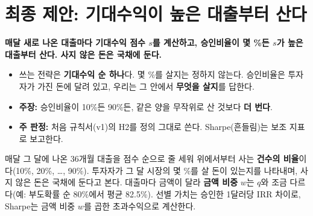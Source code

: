 \chapter{최종 제안: 기대수익이 높은 대출부터 산다}

\begin{keybox}[최종 제안(test 규칙 v2.3, 42단계)]
\textbf{매달 새로 나온 대출마다 기대수익 점수 $s$를 계산하고, 승인비율이 몇 \%든 $s$가 높은 대출부터 산다. 사지 않은 돈은 국채에 둔다.}
\begin{itemize}[leftmargin=*]
\item 쓰는 전략은 \textbf{기대수익 순 하나}다. 몇 \%를 살지는 정하지 않는다. 승인비율은 투자자가 가진 돈에 달려 있고, 우리는 그 안에서 \textbf{무엇을 살지}를 답한다.
\item \textbf{주장:} 승인비율이 10\%든 90\%든, 같은 양을 무작위로 산 것보다 \textbf{더 번다}.
\item \textbf{주 판정:} 처음 규칙서(v1)의 H2를 정의 그대로 쓴다. Sharpe(흔들림)는 보조 지표로 보고한다.
\end{itemize}
\end{keybox}

\begin{formulabox}[승인비율 $q$란]
매달 그 달에 나온 36개월 대출을 점수 순으로 줄 세워 위에서부터 사는 \textbf{건수의 비율}이다(10\%, 20\%, \dots, 90\%). 투자자가 그 달 시장의 몇 \%를 살 돈이 있는지를 나타내며, 사지 않은 돈은 국채에 둔다고 본다. 대출마다 금액이 달라 \textbf{금액 비중} $w$는 $q$와 조금 다르다(예: 부도확률 순 80\%에서 평균 82.5\%). 선별 가치는 승인한 1달러당 IRR 차이로, Sharpe는 금액 비중 $w$를 곱한 초과수익으로 계산한다.
\end{formulabox}

